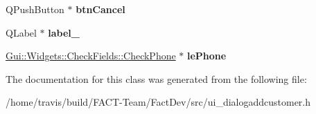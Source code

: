 \begin{DoxyCompactItemize}
\item 
\hypertarget{classUi__DialogAddCustomer_a66ab0e6f58009b6bb40e347da5eae37e}{Q\-Push\-Button $\ast$ {\bfseries btn\-Cancel}}\label{classUi__DialogAddCustomer_a66ab0e6f58009b6bb40e347da5eae37e}

\item 
\hypertarget{classUi__DialogAddCustomer_a87a612d59199e5dc5dcf14d8233e397b}{Q\-Label $\ast$ {\bfseries label\-\_}}\label{classUi__DialogAddCustomer_a87a612d59199e5dc5dcf14d8233e397b}

\item 
\hypertarget{classUi__DialogAddCustomer_a6db3754df7a09ae0619fc62a048494a4}{\hyperlink{classGui_1_1Widgets_1_1CheckFields_1_1CheckPhone}{Gui\-::\-Widgets\-::\-Check\-Fields\-::\-Check\-Phone} $\ast$ {\bfseries le\-Phone}}\label{classUi__DialogAddCustomer_a6db3754df7a09ae0619fc62a048494a4}

\end{DoxyCompactItemize}


The documentation for this class was generated from the following file\-:\begin{DoxyCompactItemize}
\item 
/home/travis/build/\-F\-A\-C\-T-\/\-Team/\-Fact\-Dev/src/ui\-\_\-dialogaddcustomer.\-h\end{DoxyCompactItemize}
